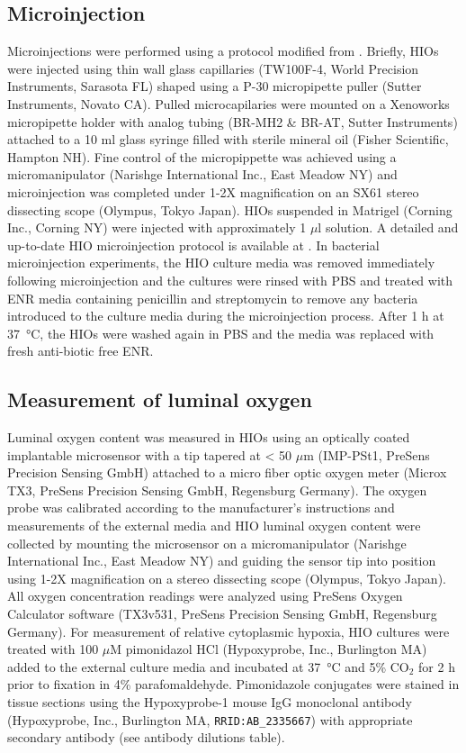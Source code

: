 \documentclass[9pt,lineo]{elife}
\begin{document}
\subsection*{{\bfseries\sffamily } Microinjection}
\label{sec:orgheadline17}
Microinjections were performed using a protocol modified from \citet{Leslie:2015}. Briefly, HIOs were injected using thin wall glass capillaries (TW100F-4, World Precision Instruments, Sarasota FL) shaped using a P-30 micropipette puller (Sutter Instruments, Novato CA). Pulled microcapilaries were mounted on a Xenoworks micropipette holder with analog tubing (BR-MH2 \& BR-AT, Sutter Instruments) attached to a 10 ml glass syringe filled with sterile mineral oil (Fisher Scientific, Hampton NH). Fine control of the micropippette was achieved using a micromanipulator (Narishge International Inc., East Meadow NY) and microinjection was completed under 1-2X magnification on an SX61 stereo dissecting scope (Olympus, Tokyo Japan). HIOs suspended in Matrigel (Corning Inc., Corning NY) were injected with approximately 1 \(\mu\)l solution. A detailed and up-to-date HIO microinjection protocol is available at \cite{Hill:gitb}. In bacterial microinjection experiments, the HIO culture media was removed immediately following microinjection and the cultures were rinsed with PBS and treated with ENR media containing penicillin and streptomycin to remove any bacteria introduced to the culture media during the microinjection process. After 1 h at \SI{37}{\celsius}, the HIOs were washed again in PBS and the media was replaced with fresh anti-biotic free ENR. 
\subsection*{{\bfseries\sffamily } Measurement of luminal oxygen}
\label{sec:orgheadline18}
Luminal oxygen content was measured in HIOs using an optically coated implantable microsensor with a tip tapered at < 50 \(\mu\)m (IMP-PSt1, PreSens Precision Sensing GmbH) attached to a micro fiber optic oxygen meter (Microx TX3, PreSens Precision Sensing GmbH, Regensburg Germany). The oxygen probe was calibrated according to the manufacturer's instructions and measurements of the external media and HIO luminal oxygen content were collected by mounting the microsensor on a micromanipulator (Narishge International Inc., East Meadow NY) and guiding the sensor tip into position using 1-2X magnification on a stereo dissecting scope (Olympus, Tokyo Japan). All oxygen concentration readings were analyzed using PreSens Oxygen Calculator software (TX3v531, PreSens Precision Sensing GmbH, Regensburg Germany). 
For measurement of relative cytoplasmic hypoxia, HIO cultures were treated with 100 \(\mu\)M pimonidazol HCl (Hypoxyprobe, Inc., Burlington MA) added to the external culture media and incubated at \SI{37}{\celsius} and 5\% CO\(_{\text{2}}\) for 2 h prior to fixation in 4\% parafomaldehyde. Pimonidazole conjugates were stained in tissue sections using the Hypoxyprobe-1 mouse IgG monoclonal antibody (Hypoxyprobe, Inc., Burlington MA, \texttt{RRID:AB\_2335667}) with appropriate secondary antibody (see antibody dilutions table).
\end{document}
